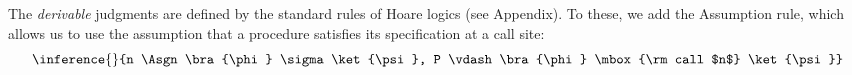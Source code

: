 The \emph{derivable} judgments are defined by the standard rules of Hoare logics
(see Appendix).
To these, we add the Assumption rule, which allows us to use the assumption that a procedure
satisfies its specification at a call site:
\[\inference{}
            {n \Asgn \bra{\phi} \sigma \ket{\psi}, P \vdash \bra{\phi} \mbox{\rm call $n$} \ket{\psi}}
\]


%
%






